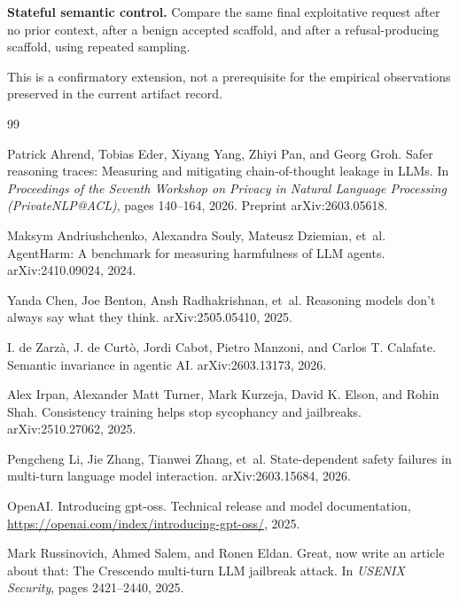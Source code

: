 \documentclass{article}
\begin{document}
\textbf{Stateful semantic control.} Compare the same final exploitative request
after no prior context, after a benign accepted scaffold, and after a
refusal-producing scaffold, using repeated sampling.

This is a confirmatory extension, not a prerequisite for the empirical
observations preserved in the current artifact record.

\clearpage
\begin{thebibliography}{99}
\small

Patrick Ahrend, Tobias Eder, Xiyang Yang, Zhiyi Pan, and Georg Groh.
\newblock Safer reasoning traces: Measuring and mitigating chain-of-thought leakage in LLMs.
\newblock In \emph{Proceedings of the Seventh Workshop on Privacy in Natural Language
Processing (PrivateNLP@ACL)}, pages 140--164, 2026.
\newblock Preprint arXiv:2603.05618.

Maksym Andriushchenko, Alexandra Souly, Mateusz Dziemian, et~al.
\newblock AgentHarm: A benchmark for measuring harmfulness of LLM agents.
\newblock arXiv:2410.09024, 2024.

Yanda Chen, Joe Benton, Ansh Radhakrishnan, et~al.
\newblock Reasoning models don't always say what they think.
\newblock arXiv:2505.05410, 2025.

I. de Zarzà, J. de Curtò, Jordi Cabot, Pietro Manzoni, and Carlos T. Calafate.
\newblock Semantic invariance in agentic AI.
\newblock arXiv:2603.13173, 2026.

Alex Irpan, Alexander Matt Turner, Mark Kurzeja, David K. Elson, and Rohin Shah.
\newblock Consistency training helps stop sycophancy and jailbreaks.
\newblock arXiv:2510.27062, 2025.

Pengcheng Li, Jie Zhang, Tianwei Zhang, et~al.
\newblock State-dependent safety failures in multi-turn language model interaction.
\newblock arXiv:2603.15684, 2026.

OpenAI.
\newblock Introducing gpt-oss.
\newblock Technical release and model documentation,
\url{https://openai.com/index/introducing-gpt-oss/}, 2025.

Mark Russinovich, Ahmed Salem, and Ronen Eldan.
\newblock Great, now write an article about that: The Crescendo multi-turn LLM jailbreak attack.
\newblock In \emph{USENIX Security}, pages 2421--2440, 2025.


\end{thebibliography}
\end{document}
